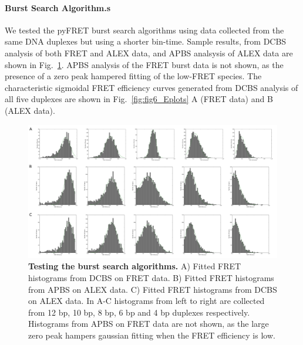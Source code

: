 \paragraph{Burst Search Algorithm.s}
We tested the pyFRET burst search algorithms using data collected from the same DNA duplexes but using a shorter bin-time. Sample results, from DCBS analysis of both FRET and ALEX data, and APBS analsysis of ALEX data are shown in Fig.~\ref{fig:burst_search}. APBS analysis of the FRET burst data is not shown, as the presence of a zero peak hampered fitting of the low-FRET species. The characteristic sigmoidal FRET efficiency curves generated from DCBS analysis of all five duplexes are shown in Fig.~\ref{fig:fig6_Eplots} A (FRET data) and B (ALEX data).

\begin{figure}[!ht]
   \begin{center}
      \includegraphics*[clip=true, width=6in]{pyFRET/burst_search.pdf}
      \caption{{\bf Testing the burst search algorithms.} A) Fitted FRET histograms from DCBS on FRET data. B) Fitted FRET histograms from APBS on ALEX data. C) Fitted FRET histograms from DCBS on ALEX data. In A-C histograms from left to right are collected from 12 bp, 10 bp, 8 bp, 6 bp and 4 bp duplexes respectively. Histograms from APBS on FRET data are not shown, as the large zero peak hampers gaussian fitting when the FRET efficiency is low.}
      \label{fig:burst_search}
   \end{center}
\end{figure}


